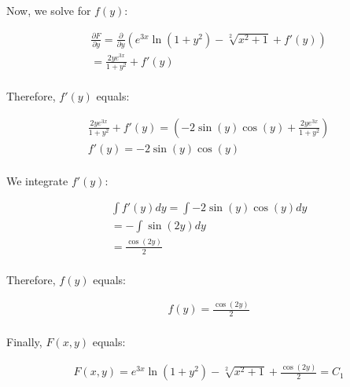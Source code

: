 \documentclass{article}
\begin{document}
\begin{singlespace}
        \begin{flushleft}
            Now, we solve for $f(y)$:
        \end{flushleft}
        \begin{align*}
            &\frac{\partial{F}}{\partial{y}} 
            = \frac{\partial{}}{\partial{y}}\left( e^{3x}\ln(1+y^{2}) - \sqrt[2]{x^{2}+1} + f'(y) \right) \\
            &= \frac{2ye^{3x}}{1+y^{2}} + f'(y) \\
        \end{align*}
        \begin{flushleft}
            Therefore, $f'(y)$ equals:
        \end{flushleft}
        \begin{align*}
            &\frac{2ye^{3x}}{1+y^{2}} + f'(y) = \left( -2\sin(y)\cos(y) + \frac{2ye^{3x}}{1+y^{2}}\right) \\
            &f'(y) = -2\sin(y)\cos(y) \\
        \end{align*}
        \begin{flushleft}
            We integrate $f'(y)$:
        \end{flushleft}
        \begin{align*}
            &\int f'(y)dy = \int -2\sin(y)\cos(y)dy \\
            &= -\int \sin(2y)dy \\
            &= \frac{\cos(2y)}{2} \\ 
        \end{align*}
        \begin{flushleft}
            Therefore, $f(y)$ equals:
        \end{flushleft}
        \begin{align*}
            &f(y) = \frac{\cos(2y)}{2} \\
        \end{align*}
        \begin{flushleft}
            Finally, $F(x, y)$ equals:
        \end{flushleft}
        \begin{align*}
            &F(x, y) = e^{3x}\ln(1+y^{2}) - \sqrt[2]{x^{2}+1} + \frac{\cos(2y)}{2} = C_1 \\
        \end{align*}
    \end{singlespace}
\end{document}
